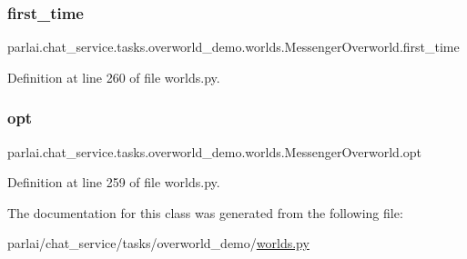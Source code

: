 \subsubsection{\texorpdfstring{first\+\_\+time}{first\_time}}
{\footnotesize\ttfamily parlai.\+chat\+\_\+service.\+tasks.\+overworld\+\_\+demo.\+worlds.\+Messenger\+Overworld.\+first\+\_\+time}



Definition at line 260 of file worlds.\+py.

\mbox{\label{classparlai_1_1chat__service_1_1tasks_1_1overworld__demo_1_1worlds_1_1MessengerOverworld_a56ded4b12c29ec7afe535fa465e2f060}} 
\subsubsection{\texorpdfstring{opt}{opt}}
{\footnotesize\ttfamily parlai.\+chat\+\_\+service.\+tasks.\+overworld\+\_\+demo.\+worlds.\+Messenger\+Overworld.\+opt}



Definition at line 259 of file worlds.\+py.



The documentation for this class was generated from the following file\+:\begin{DoxyCompactItemize}
\item 
parlai/chat\+\_\+service/tasks/overworld\+\_\+demo/\hyperlink{parlai_2chat__service_2tasks_2overworld__demo_2worlds_8py}{worlds.\+py}\end{DoxyCompactItemize}
